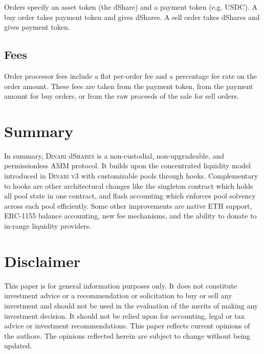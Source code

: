 \documentclass[sigconf,nonacm,prologue,table]{acmart}
\numberwithin{equation}{section}
\theoremstyle{definition}
\theoremstyle{remark}
\newcommand{\dshares}{\textsc{Dinari} d\textsc{Shares} }
\begin{document}
Orders specify an asset token (the dShare) and a payment token (e.g. USDC). A buy order takes payment token and gives dShares. A sell order takes dShares and gives payment token. 

\subsection{Fees}

Order processor fees include a flat per-order fee and a percentage fee rate on the order amount. These fees are taken from the payment token, from the payment amount for buy orders, or from the raw proceeds of the sale for sell orders.

\section{Summary}
In summary, \dshares is a non-custodial, non-upgradeable, and permissionless AMM protocol. It builds upon the concentrated liquidity model introduced in \textsc{Dinari v3} with customizable pools through hooks. Complementary to hooks are other architectural changes like the singleton contract which holds all pool state in one contract, and flash accounting which enforces pool solvency across each pool efficiently. Some other improvements are native ETH support, ERC-1155 balance accounting, new fee mechanisms, and the ability to donate to in-range liquidity providers.




\section*{Disclaimer}

This paper is for general information purposes only. It does not constitute investment advice or a recommendation or solicitation to buy or sell any investment and should not be used in the evaluation of the merits of making any investment decision. It should not be relied upon for accounting, legal or tax advice or investment recommendations.  This paper reflects current opinions of the authors. The opinions reflected herein are subject to change without being updated. 
\end{document}
